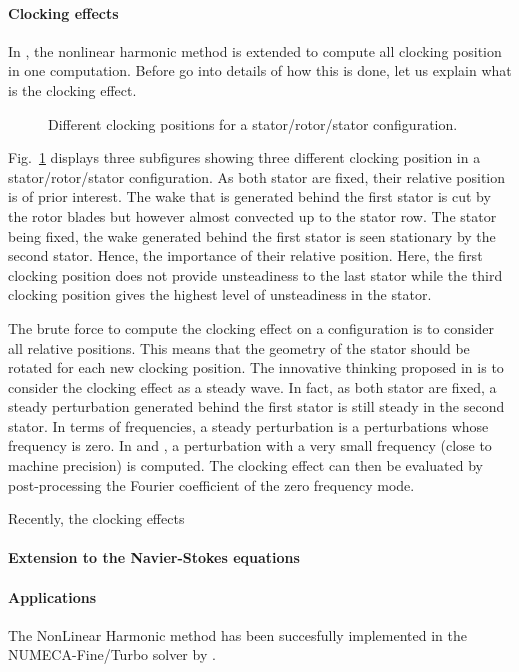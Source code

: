 \paragraph{Clocking effects}
In \citet{He2002}, the nonlinear harmonic method is extended to
compute all clocking position in one computation. Before
go into details of how this is done, let us explain what is
the clocking effect.
\begin{figure}[htbp]
  \centering 
  \caption{Different clocking positions for a stator/rotor/stator
  configuration.}
  \label{fig:sm_nlh_clocking_effect}
\end{figure}
Fig.~\ref{fig:sm_nlh_clocking_effect} displays three subfigures showing three
different clocking position in a stator/rotor/stator configuration.
As both stator are fixed, their relative position is of 
prior interest. The wake that is generated behind the first stator
is cut by the rotor blades but however almost convected up to 
the stator row. The stator being fixed, the wake generated
behind the first stator is seen stationary by the second stator.
Hence, the importance of their relative position. Here, the
first clocking position does not provide unsteadiness to the
last stator while the third clocking position gives the highest
level of unsteadiness in the stator. 

The brute force to compute the clocking effect on a
configuration is to consider all relative positions. This means
that the geometry of the stator should be rotated for each new 
clocking position. The innovative thinking proposed in 
\citet{He2002} is to consider the clocking effect as a steady wave.
In fact, as both stator are fixed, a steady perturbation
generated behind the first stator is still steady in the second stator.
In terms of frequencies, a steady perturbation is a perturbations 
whose frequency is zero. In \citet{He2002} and \cite{Vilmin2009}, 
a perturbation with a very small frequency (close to machine precision)
is computed. The clocking effect can then be evaluated by
post-processing the Fourier coefficient of the zero frequency mode.

Recently, the clocking effects \citet{Vilmin2013a}

\paragraph{Extension to the Navier-Stokes equations}

\paragraph{Applications}
The NonLinear Harmonic method 
has been succesfully implemented
in the NUMECA-Fine/Turbo solver by 
\citet{Vilmin2006, Vilmin2007, Vilmin2009, Vilmin2013a}.